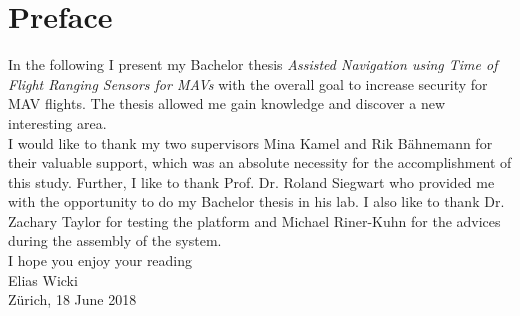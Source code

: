 \chapter*{Preface}

In the following I present my Bachelor thesis \textit{Assisted Navigation using Time of Flight Ranging Sensors for MAVs} with the overall goal to increase security for MAV flights. The thesis allowed me gain knowledge and discover a new interesting area.\\

I would like to thank my two supervisors Mina Kamel and Rik B\"ahnemann for their valuable support, which was an absolute 
necessity for the accomplishment of this study. Further, I like to thank Prof. Dr. Roland Siegwart who provided me with the opportunity to do my Bachelor thesis in his lab. I also like to thank Dr. Zachary Taylor for testing the platform and Michael Riner-Kuhn for the advices during the assembly of the system. \\

I hope you enjoy your reading\\

Elias Wicki\\

Z\"urich, 18 June 2018